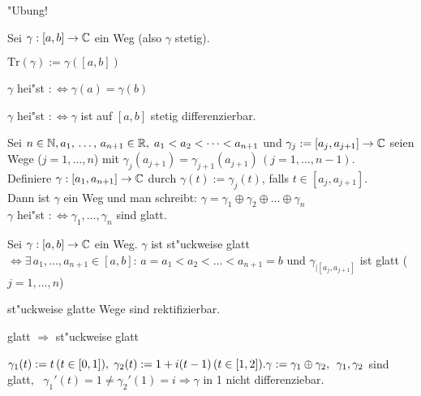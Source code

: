 \documentclass[a4paper,twoside,DIV15,BCOR12mm]{scrbook}
\def\Tr{\text{Tr}}
\begin{document}
\begin{beweis}
"Ubung!
\end{beweis}

\begin{definition}
Sei $\gamma: [a,b] \rightarrow \mathbb{C}$ ein Weg (also $\gamma$ stetig).
\begin{liste}
\item $\Tr(\gamma):= \gamma([a,b])$ \quad {}
\item $\gamma$ hei"st  $:\Leftrightarrow \gamma(a) = \gamma(b)$
\item $\gamma$ hei"st  $:\Leftrightarrow \gamma$ ist auf $[a,b]$ stetig differenzierbar.
\end{liste}
\end{definition}

\begin{definition}
Sei $n \in \mathbb{N}, a_1,\, \dots,\, a_{n+1} \in \mathbb{R}, \; a_1<a_2<\dots<a_{n+1}$ und $\gamma_j:=[a_j,a_{j+1}] \rightarrow \mathbb{C}$ seien Wege ($j=1,\dots,n$) mit $\gamma_j(a_{j+1}) = \gamma_{j+1}(a_{j+1}) \, (j=1,\dots,n-1)$. \\
Definiere $\gamma:[a_1,a_{n+1}] \rightarrow \mathbb{C}$ durch $\gamma(t) := \gamma_j(t)$, falls $t\in [a_j,a_{j+1}].$\\ 
Dann ist $\gamma$ ein Weg und man schreibt: $\gamma = \gamma_1 \oplus \gamma_2 \oplus \dots \oplus \gamma_n$\\
$\gamma$ hei"st  $: \Leftrightarrow \gamma_1,\ldots,\gamma_n$ sind glatt.
\end{definition}


\begin{bemerkungen}
\item Sei $\gamma:[a,b] \rightarrow \mathbb{C}$ ein Weg. $\gamma$ ist st"uckweise glatt $\Leftrightarrow \exists \, a_1,\dots,a_{n+1} \in [a,b]: \, a=a_1<a_2<\dots<a_{n+1}=b$ und $\gamma_{|[a_j,a_{j+1}]}$ ist glatt ($j=1,\dots,n$)
\item st"uckweise glatte Wege sind rektifizierbar.
\item glatt $\Rightarrow$ st"uckweise glatt
\end{bemerkungen}

\begin{beispiel}
$\gamma_1(t) := t \, (t \in [0,1]), \; \gamma_2(t):= 1+ i(t-1) \, (t \in [1,2]). \\
\gamma := \gamma_1 \oplus \gamma_2, \;\, \gamma_1, \gamma_2$ sind glatt, \, $\gamma_1'(t) = 1 \not= \gamma_2'(1) = i \Rightarrow \gamma$ in 1 nicht differenziebar.
\end{beispiel}
\end{document}
